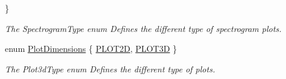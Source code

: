 \begin{DoxyCompactItemize}
 \}
\begin{DoxyCompactList}\small\item\em \-The \-Spectrogram\-Type enum \-Defines the different type of spectrogram plots. \end{DoxyCompactList}\item 
enum \hyperlink{group___scope_plugin_ga51d68dee7f98e408c8929a70cc78931d}{\-Plot\-Dimensions} \{ \hyperlink{group___scope_plugin_gga51d68dee7f98e408c8929a70cc78931da8aa50aacb48cd4541c8b865ea21a9776}{\-P\-L\-O\-T2\-D}, 
\hyperlink{group___scope_plugin_gga51d68dee7f98e408c8929a70cc78931da03290a428467402632eee034b634aa93}{\-P\-L\-O\-T3\-D}
 \}
\begin{DoxyCompactList}\small\item\em \-The \-Plot3d\-Type enum \-Defines the different type of plots. \end{DoxyCompactList}\end{DoxyCompactItemize}

